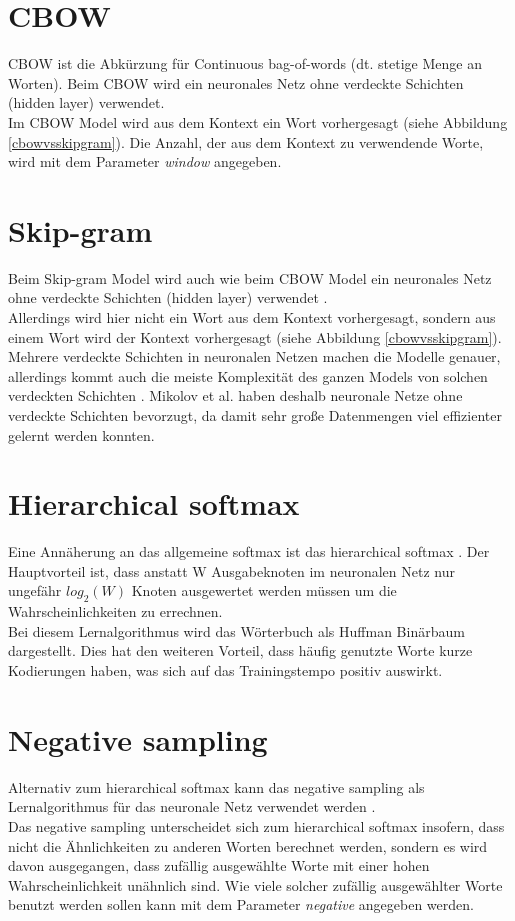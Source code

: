 \documentclass[12pt,a4paper]{report}
\begin{document}
	\section{CBOW}
	CBOW ist die Abkürzung für Continuous bag-of-words (dt. stetige Menge an Worten). Beim CBOW wird ein neuronales Netz ohne verdeckte Schichten (hidden layer) verwendet\cite{DBLP:journals/corr/abs-1301-3781}.\\
	Im CBOW Model wird aus dem Kontext ein Wort vorhergesagt (siehe Abbildung \ref{cbowvsskipgram}). Die Anzahl, der aus dem Kontext zu verwendende Worte, wird mit dem Parameter \textit{window} angegeben.
	
	\section{Skip-gram}
	Beim Skip-gram Model wird auch wie beim CBOW Model ein neuronales Netz ohne verdeckte Schichten (hidden layer) verwendet \citep{DBLP:journals/corr/abs-1301-3781}.\\
	Allerdings wird hier nicht ein Wort aus dem Kontext vorhergesagt, sondern aus einem Wort wird der Kontext vorhergesagt (siehe Abbildung \ref{cbowvsskipgram}).\\
	
	Mehrere verdeckte Schichten in neuronalen Netzen machen die Modelle genauer, allerdings kommt auch die meiste Komplexität des ganzen Models von solchen verdeckten Schichten \citep{DBLP:journals/corr/abs-1301-3781}. Mikolov et al. haben deshalb neuronale Netze ohne verdeckte Schichten bevorzugt, da damit sehr große Datenmengen viel effizienter gelernt werden konnten.
	
	\section{Hierarchical softmax}
	Eine Annäherung an das allgemeine softmax ist das hierarchical softmax \citep{DBLP:journals/corr/MikolovSCCD13}. Der Hauptvorteil ist, dass anstatt W Ausgabeknoten im neuronalen Netz nur ungefähr $log_2(W) $ Knoten ausgewertet werden müssen um die Wahrscheinlichkeiten zu errechnen. \\
	Bei diesem Lernalgorithmus wird das Wörterbuch als Huffman Binärbaum dargestellt. Dies hat den weiteren Vorteil, dass häufig genutzte Worte kurze Kodierungen haben, was sich auf das Trainingstempo positiv auswirkt.
	
	\section{Negative sampling}
	\label{sec:negativeSampling}
	Alternativ zum hierarchical softmax kann das negative sampling als Lernalgorithmus für das neuronale Netz verwendet werden \citep{DBLP:journals/corr/MikolovSCCD13}.\\
	Das negative sampling unterscheidet sich zum hierarchical softmax insofern, dass nicht die Ähnlichkeiten zu anderen Worten berechnet werden, sondern es wird davon ausgegangen, dass zufällig ausgewählte Worte mit einer hohen Wahrscheinlichkeit unähnlich sind. Wie viele solcher zufällig ausgewählter Worte benutzt werden sollen kann mit dem Parameter \textit{negative} angegeben werden.
	
\end{document}
